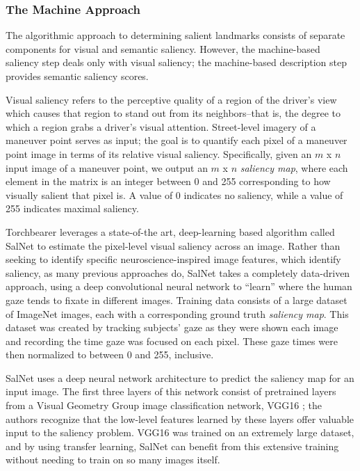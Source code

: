 \subsubsection{The Machine Approach}
The algorithmic approach to determining salient landmarks consists of separate components for visual and semantic saliency. However, the machine-based saliency step deals only with visual saliency; the machine-based description step provides semantic saliency scores.

Visual saliency refers to the perceptive quality of a region of the driver’s view which causes that region to stand out from its neighbors--that is, the degree to which a region grabs a driver’s visual attention. Street-level imagery of a maneuver point serves as input; the goal is to quantify each pixel of a maneuver point image in terms of its relative visual saliency. Specifically, given an $m$ x $n$ input image of a maneuver point, we output an $m$ x $n$ \textit{saliency map}, where each element in the matrix is an integer between 0 and 255 corresponding to how visually salient that pixel is. A value of 0 indicates no saliency, while a value of 255 indicates maximal saliency.

Torchbearer leverages a state-of-the art, deep-learning based algorithm called SalNet \cite{Pan_2016_CVPR} to estimate the pixel-level visual saliency across an image. Rather than seeking to identify specific neuroscience-inspired image features, which identify saliency, as many previous approaches do, SalNet takes a completely data-driven approach, using a deep convolutional neural network to “learn” where the human gaze tends to fixate in different images. Training data consists of a large dataset of ImageNet \cite{imagenet_cvpr09} images, each with a corresponding ground truth \textit{saliency map}. This dataset was created by tracking subjects' gaze as they were shown each image and recording the time gaze was focused on each pixel. These gaze times were then normalized to between 0 and 255, inclusive.

SalNet uses a deep neural network architecture to predict the saliency map for an input image. The first three layers of this network consist of pretrained layers from a Visual Geometry Group image classification network, VGG16 \cite{Simonyan14c}; the authors recognize that the low-level features learned by these layers offer valuable input to the saliency problem. VGG16 was trained on an extremely large dataset, and by using transfer learning, SalNet can benefit from this extensive training without needing to train on so many images itself. 

